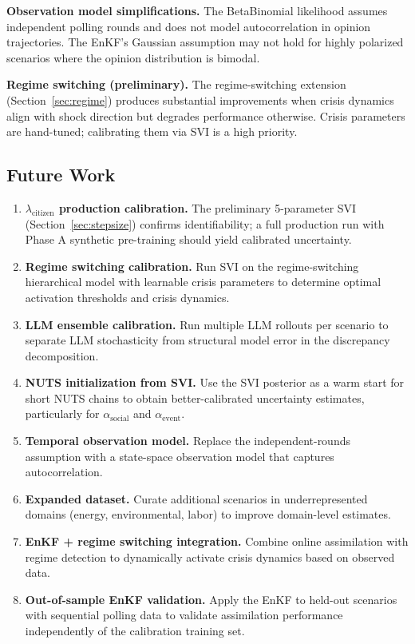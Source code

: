 \documentclass[12pt]{article}
\begin{document}
\textbf{Observation model simplifications.} The BetaBinomial likelihood assumes independent polling rounds and does not model autocorrelation in opinion trajectories. The EnKF's Gaussian assumption may not hold for highly polarized scenarios where the opinion distribution is bimodal.

\textbf{Regime switching (preliminary).} The regime-switching extension (Section~\ref{sec:regime}) produces substantial improvements when crisis dynamics align with shock direction but degrades performance otherwise. Crisis parameters are hand-tuned; calibrating them via SVI is a high priority.

\subsection{Future Work}

\begin{enumerate}
    \item \textbf{$\lambda_{\text{citizen}}$ production calibration.} The preliminary 5-parameter SVI (Section~\ref{sec:stepsize}) confirms identifiability; a full production run with Phase A synthetic pre-training should yield calibrated uncertainty.

    \item \textbf{Regime switching calibration.} Run SVI on the regime-switching hierarchical model with learnable crisis parameters to determine optimal activation thresholds and crisis dynamics.

    \item \textbf{LLM ensemble calibration.} Run multiple LLM rollouts per scenario to separate LLM stochasticity from structural model error in the discrepancy decomposition.

    \item \textbf{NUTS initialization from SVI.} Use the SVI posterior as a warm start for short NUTS chains to obtain better-calibrated uncertainty estimates, particularly for $\alpha_{\text{social}}$ and $\alpha_{\text{event}}$.

    \item \textbf{Temporal observation model.} Replace the independent-rounds assumption with a state-space observation model that captures autocorrelation.

    \item \textbf{Expanded dataset.} Curate additional scenarios in underrepresented domains (energy, environmental, labor) to improve domain-level estimates.

    \item \textbf{EnKF + regime switching integration.} Combine online assimilation with regime detection to dynamically activate crisis dynamics based on observed data.

    \item \textbf{Out-of-sample EnKF validation.} Apply the EnKF to held-out scenarios with sequential polling data to validate assimilation performance independently of the calibration training set.
\end{enumerate}
\end{document}
